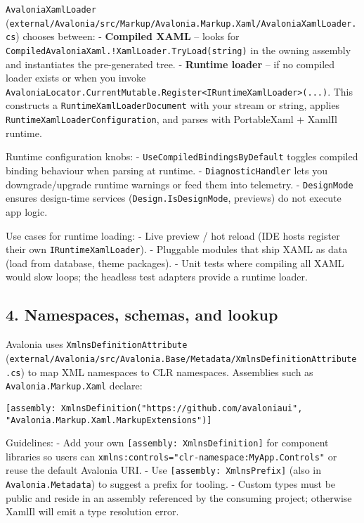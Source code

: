 \passthrough{\lstinline!AvaloniaXamlLoader!}
(\passthrough{\lstinline!external/Avalonia/src/Markup/Avalonia.Markup.Xaml/AvaloniaXamlLoader.cs!})
chooses between: - \textbf{Compiled XAML} -- looks for
\passthrough{\lstinline"CompiledAvaloniaXaml.!XamlLoader.TryLoad(string)"}
in the owning assembly and instantiates the pre-generated tree. -
\textbf{Runtime loader} -- if no compiled loader exists or when you
invoke
\passthrough{\lstinline!AvaloniaLocator.CurrentMutable.Register<IRuntimeXamlLoader>(...)!}.
This constructs a \passthrough{\lstinline!RuntimeXamlLoaderDocument!}
with your stream or string, applies
\passthrough{\lstinline!RuntimeXamlLoaderConfiguration!}, and parses
with PortableXaml + XamlIl runtime.

Runtime configuration knobs: -
\passthrough{\lstinline!UseCompiledBindingsByDefault!} toggles compiled
binding behaviour when parsing at runtime. -
\passthrough{\lstinline!DiagnosticHandler!} lets you downgrade/upgrade
runtime warnings or feed them into telemetry. -
\passthrough{\lstinline!DesignMode!} ensures design-time services
(\passthrough{\lstinline!Design.IsDesignMode!}, previews) do not execute
app logic.

Use cases for runtime loading: - Live preview / hot reload (IDE hosts
register their own \passthrough{\lstinline!IRuntimeXamlLoader!}). -
Pluggable modules that ship XAML as data (load from database, theme
packages). - Unit tests where compiling all XAML would slow loops; the
headless test adapters provide a runtime loader.

\subsection{4. Namespaces, schemas, and
lookup}\label{namespaces-schemas-and-lookup}

Avalonia uses \passthrough{\lstinline!XmlnsDefinitionAttribute!}
(\passthrough{\lstinline!external/Avalonia/src/Avalonia.Base/Metadata/XmlnsDefinitionAttribute.cs!})
to map XML namespaces to CLR namespaces. Assemblies such as
\passthrough{\lstinline!Avalonia.Markup.Xaml!} declare:

\begin{lstlisting}
[assembly: XmlnsDefinition("https://github.com/avaloniaui", "Avalonia.Markup.Xaml.MarkupExtensions")]
\end{lstlisting}

Guidelines: - Add your own
\passthrough{\lstinline![assembly: XmlnsDefinition]!} for component
libraries so users can
\passthrough{\lstinline!xmlns:controls="clr-namespace:MyApp.Controls"!}
or reuse the default Avalonia URI. - Use
\passthrough{\lstinline![assembly: XmlnsPrefix]!} (also in
\passthrough{\lstinline!Avalonia.Metadata!}) to suggest a prefix for
tooling. - Custom types must be public and reside in an assembly
referenced by the consuming project; otherwise XamlIl will emit a type
resolution error.

